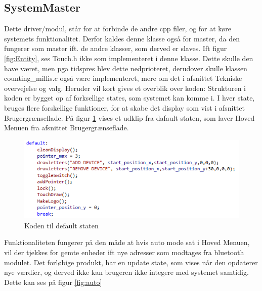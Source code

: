 \subsection{SystemMaster}
Dette driver/modul, står for at forbinde de andre cpp filer, og for at køre systemets funktionalitet. Derfor kaldes denne klasse også for master, da den fungerer som master ift. de andre klasser, som derved er slaves. Ift figur \ref{fig:Entity}, ses Touch.h ikke som implementeret i denne klasse. Dette skulle den have været, men pga tidspres blev dette nedprioteret, derudover skulle klassen counting\_millis.c også være implementeret, mere om det i afsnittet Tekniske overvejelse og valg. 
Heruder vil kort gives et overblik over koden:
\newline
\newline
Strukturen i koden er bygget op af forksellige states, som systemet kan komme i. I hver state, bruges flere forskellige funktioner, for at skabe det display som vist i afsnittet Brugergrænseflade. På figur \ref{fig:dafaultkode} vises
et udklip fra dafault staten, som laver Hoved Menuen fra afsnittet Brugergrænseflade. 
\begin{figure}[H]
	\centering
	\includegraphics[width = 300 pt]{Img/dafaultkode.PNG}
	\caption{Koden til default staten}
	\label{fig:dafaultkode}
\end{figure}

Funktionaliteten fungerer på den måde at hvis auto mode sat i Hoved Menuen, vil der tjekkes for gemte enheder ift nye adresser som modtages fra bluetooth modulet. Det forløbige produkt, har en update state, som vises når den opdaterer nye værdier, og derved ikke kan brugeren ikke integere med systemet samtidig. Dette kan ses på figur \ref{fig:auto}